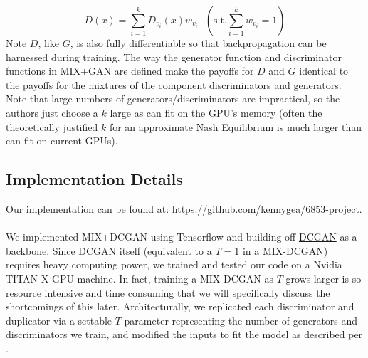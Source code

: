 \documentclass{article}
\begin{document}
\[
  D(x) = \sum\limits_{i = 1}^k D_{v_i}(x) w_{v_i} \mbox{  } (\mbox{s.t.} \sum\limits_{i=1}^k w_{v_i} = 1)
\]
Note $D$, like $G$, is also fully differentiable so that backpropagation can be harnessed during training. The way the generator function and discriminator functions in MIX+GAN are defined make the payoffs for $D$ and $G$ identical to the payoffs for the mixtures of the component discriminators and generators. Note that large numbers of generators/discriminators are impractical, so the authors just choose a $k$ large as can fit on the GPU's memory (often the theoretically justified $k$ for an approximate Nash Equilibrium is much larger than can fit on current GPUs).

\subsection{Implementation Details}
Our implementation can be found at: \url{https://github.com/kennygea/6853-project}.
\\\\
We implemented MIX+DCGAN using Tensorflow and building off \href{https://github.com/carpedm20/DCGAN-tensorflow}{DCGAN} as a backbone. Since DCGAN itself (equivalent to a $T=1$ in a MIX-DCGAN) requires heavy computing power, we trained and tested our code on a Nvidia TITAN X GPU machine. In fact, training a MIX-DCGAN as $T$ grows larger is so resource intensive and time consuming that we will specifically discuss the shortcomings of this later. Architecturally, we replicated each discriminator and duplicator via a settable $T$ parameter representing the number of generators and discriminators we train, and modified the inputs to fit the model as described per \citet{Arora17}. 
\end{document}
